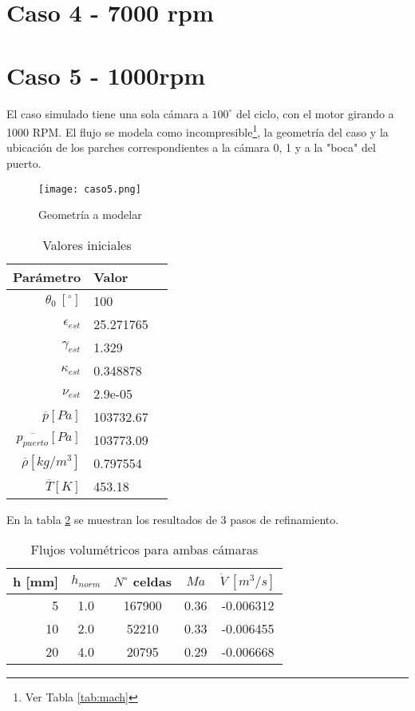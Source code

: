 \section{Caso 4 - 7000 rpm}

\section{Caso 5 - 1000rpm}

El caso simulado tiene una sola cámara a $100^{\circ}$ del ciclo, con el motor
girando a 1000 RPM.
%
El flujo se modela como incompresible\footnote{Ver Tabla \ref{tab:mach}}, la
geometría del caso y la ubicación de los parches correspondientes a la cámara
0, 1 y a la "boca" del puerto.

\begin{figure}
    \centering
    \texttt{[image: caso5.png]}
    \caption{Geometría a modelar}
    \label{fig:caso5}
\end{figure}

\begin{table}
    \centering
    \begin{tabular}{rll}\toprule
        Parámetro & Valor \\ \midrule
        $\theta_0\ [^{\circ}]$ & 100 \\
        $\epsilon_{est}$ & 25.271765 \\
        $\gamma_{est}$ & 1.329 \\
        $\kappa_{est}$ & 0.348878 \\
        $\nu_{est}$ & 2.9e-05 \\
        $\overline{p} [Pa]$ & 103732.67 \\
        $\overline{p_{puerto}} [Pa]$ & 103773.09 \\
        $\overline{\rho} [kg/m^3]$ & 0.797554 \\
        $\overline{T} [K]$ & 453.18 \\ \bottomrule
    \end{tabular}
    \caption{Valores iniciales}
    \label{tab:caso5_ci}
\end{table}

En la tabla \ref{tab:res_caso5} se muestran los resultados de 3 pasos de
refinamiento.

\begin{table}[h]
    \centering
    \begin{tabular}{rcccc}\toprule
        h [mm] & $h_{norm}$ & $N^{\circ}$ celdas & $Ma$ & $\dot{V}\ [m^3/s]$ \\ \midrule
        5      & 1.0        & 167900             & 0.36 & -0.006312 \\
        10     & 2.0        & 52210              & 0.33 & -0.006455 \\
        20     & 4.0        & 20795              & 0.29 & -0.006668 \\ \bottomrule
    \end{tabular}
    \caption{Flujos volumétricos para ambas cámaras}
    \label{tab:res_caso5}
\end{table}

